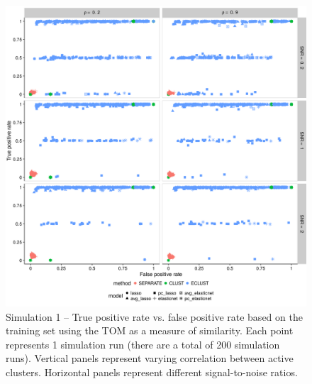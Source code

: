 \begin{figure}
	\includegraphics[scale=0.6, keepaspectratio]{./figs/hydra/results/figures/sim1-sept10/tpr_fpr_TOM_sim1.png}
	\caption{Simulation 1 -- True positive rate vs. false positive rate based on the training set using the TOM as a measure of similarity. Each point represents 1 simulation run (there are a total of 200 simulation runs). Vertical panels represent varying correlation between active clusters. Horizontal panels represent different signal-to-noise ratios.}
	\label{fig:tpr_fpr_TOM_sim1}
\end{figure}


